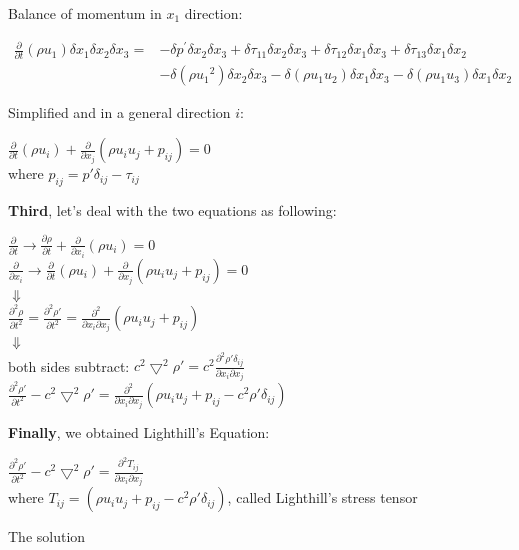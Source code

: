 \documentclass[graybox]{svmult}
\begin{document}
Balance of momentum in $ x_1$ direction:

$ \begin{aligned} \frac{\partial}{\partial t}\left(\rho u_1\right) \delta x_1 \delta x_2 \delta x_3= & -\delta  p^{\prime} \delta x_2 \delta x_3+\delta \tau_{11} \delta x_2 \delta x_3+\delta \tau_{12} \delta x_1 \delta x_3+\delta \tau_{13} \delta x_1 \delta x_2 \\ & -\delta\left(\rho u_1{ }^2\right) \delta x_2 \delta x_3-\delta\left(\rho u_1 u_2\right) \delta x_1 \delta x_3-\delta\left(\rho u_1 u_3\right) \delta x_1 \delta x_2\end{aligned} $

Simplified and in a general direction $ i $:
\begin{center}
    $ \frac{\partial}{\partial t}\left(\rho u_i\right)+\frac{\partial}{\partial x_j}\left(\rho u_i u_j + p_{i j}\right)=0 $ \\
    where $ p_{i j} = p'\delta_{ij} - \tau_{ij} $
\end{center}

\textbf{Third}, let's deal with the two equations as following:
\begin{center}
    $ \frac{\partial}{\partial t} \to  \frac{\partial \rho}{\partial t}+\frac{\partial }{\partial x_i}(\rho u_i)=0 $ \\
    $ \frac{\partial}{\partial x_i} \to \frac{\partial}{\partial t}\left(\rho u_i\right)+\frac{\partial}{\partial x_j}\left(\rho u_i u_j + p_{i j}\right)=0 $ \\
    $ \Downarrow $ \\
    $ \frac{\partial^2 \rho}{\partial t^2} = \frac{\partial^2 \rho'}{\partial t^2} = \frac{\partial^2}{\partial x_i \partial x_j}\left(\rho u_i u_j + p_{i j}\right) $ \\
    $ \Downarrow $ \\
    both sides subtract: 
    $ c^2\bigtriangledown^2\rho'=c^2 \frac{\partial^2 \rho' \delta_{ij}}{\partial x_i \partial x_j} $ \\
    $ \frac{\partial^2 \rho'}{\partial t^2} -c^2\bigtriangledown^2\rho' = \frac{\partial^2}{\partial x_i \partial x_j}\left(\rho u_i u_j + p_{i j} - c^2 \rho' \delta_{ij}\right) $ \\

\end{center}

\textbf{Finally}, we obtained Lighthill's Equation:
\begin{center}
    $ \frac{\partial^2 \rho'}{\partial t^2} -c^2\bigtriangledown^2\rho' = \frac{\partial^2 T_{ij}}{\partial x_i \partial x_j} $ \\
    where $ T_{ij} = \left(\rho u_i u_j + p_{i j} - c^2 \rho' \delta_{ij}\right) $, called Lighthill's stress tensor
\end{center}
The solution 
\end{document}
